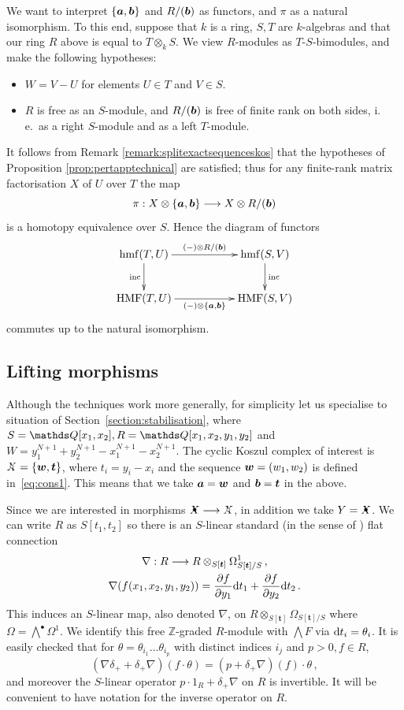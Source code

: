 \documentclass{compositio}
\theoremstyle{definition}
\numberwithin{equation}{section}
\def\inc{\operatorname{inc}}
\DeclareMathOperator{\hmf}{hmf}
\DeclareMathOperator{\HMF}{HMF}
\begin{document}
We want to interpret $\{ \boldsymbol{a}, \boldsymbol{b} \}$ and $R/(\boldsymbol{b})$ as functors, and $\pi$ as a natural isomorphism. To this end, suppose that $k$ is a ring, $S,T$ are $k$-algebras and that our ring $R$ above is equal to $T \otimes_k S$. We view $R$-modules as $T$-$S$-bimodules, and make the following hypotheses:
\begin{itemize}
\item $W = V - U$ for elements $U \in T$ and $V \in S$.
\item $R$ is free as an $S$-module, and $R/(\boldsymbol{b})$ is free of finite rank on both sides, i.\,e.~as a right $S$-module and as a left $T$-module.
\end{itemize}
It follows from Remark \ref{remark:splitexactsequenceskos} that the hypotheses of Proposition \ref{prop:pertapptechnical} are satisfied; thus for any finite-rank matrix factorisation $X$ of $U$ over $T$ the map
\[
\pi: X \otimes \{ \boldsymbol{a}, \boldsymbol{b} \} \longrightarrow X \otimes R/(\boldsymbol{b})
\]
is a homotopy equivalence over $S$. Hence the diagram of functors
\[
\xymatrix@C+2.5pc{
\hmf(T, U) \ar[d]_-{\inc}\ar[r]^-{(-) \otimes R/(\bb)} & \hmf(S,V) \ar[d]^-{\inc}\\
\HMF(T, U) \ar[r]_-{(-) \otimes \{ \bs{a}, \bs{b} \}} & \HMF(S,V)
}
\]
commutes up to the natural isomorphism.

\subsection{Lifting morphisms}\label{subsection:liftingmorphisms}

Although the techniques work more generally, for simplicity let us specialise to situation of Section~\ref{section:stabilisation}, where $S = \QQ[x_1, x_2], R = \QQ[x_1,x_2,y_1,y_2]$ and $W = y_1^{N+1} + y_2^{N+1} - x_1^{N+1} - x_2^{N+1}$. The cyclic Koszul complex of interest is $\Xcirc = \{ \bs{w}, \bs{t} \}$, where $t_i = y_i - x_i$ and the sequence $\boldsymbol{w} = (w_1,w_2)$ is defined in~\eqref{eq:cons1}. This means that we take $\boldsymbol{a}=\boldsymbol{w}$ and $\boldsymbol{b} = \boldsymbol{t}$ in the above. 

Since we are interested in morphisms $\Xbul \lto \Xcirc$, in addition we take $Y = \Xbul$. We can write $R$ as $S[t_1,t_2]$ so there is an $S$-linear standard (in the sense of \cite[Section 8.1]{dm1102.2957}) flat connection
\begin{gather*}
\nabla: R \longrightarrow R \otimes_{S[\boldsymbol{t}]} \Omega^1_{S[\boldsymbol{t}]/S} \, ,\\
\nabla( f(x_1,x_2,y_1,y_2) ) = \frac{\partial f}{\partial y_1} \mathrm{d} t_1 + \frac{\partial f}{\partial y_2} \mathrm{d} t_2 \, .
\end{gather*}
This induces an $S$-linear map, also denoted $\nabla$, on $R \otimes_{S[\boldsymbol{t}]} \Omega_{S[\boldsymbol{t}]/S}$ where $\Omega = \bigwedge^\bullet \Omega^1$. We identify this free $\mathds{Z}$-graded $R$-module with $\bigwedge F$ via $\mathrm{d} t_i = \theta_i$. It is easily checked that for $\theta = \theta_{i_1} \ldots \theta_{i_p}$ with distinct indices $i_j$ and $p > 0, f \in R$,
\[
(\nabla \delta_+ + \delta_+ \nabla)(f \cdot \theta) = (p + \delta_{+}\nabla)(f) \cdot \theta \, ,
\]
and moreover the $S$-linear operator $p \cdot 1_R + \delta_{+} \nabla$ on $R$ is invertible. It will be convenient to have notation for the inverse operator on $R$.
\end{document}
